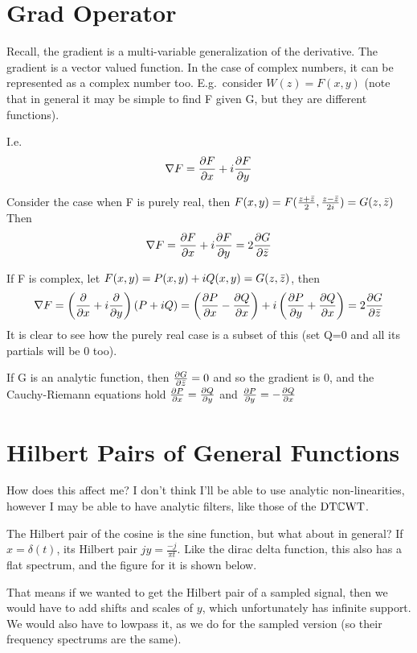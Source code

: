 \section{Grad Operator}
Recall, the gradient is a multi-variable  generalization of the derivative. The
gradient is a vector valued function. In the case of complex numbers, it can be
represented as a complex number too. E.g.\ consider $W(z) = F(x,y)$ (note that
in general it may be simple to find F given G, but they are different
functions).

I.e. 
$$\nabla F = \frac{\partial F}{\partial x} + i \frac{\partial F}{\partial y}$$

Consider the case when F is purely real, then 
$F(x,y) = F(\frac{z+\bar{z}}{2},\frac{z-\bar{z}}{2i}) = G(z,\bar{z})$
Then
$$\nabla F = \frac{\partial F}{\partial x} + i \frac{\partial F}{\partial y} = 2\frac{\partial G}{\partial \bar{z}}$$

If F is complex, let $F(x,y) = P(x,y) + iQ(x,y) = G(z,\bar{z})$, then
$$\nabla F = \left(\frac{\partial }{\partial x} + i \frac{\partial }{\partial y}\right)(P+iQ) 
           = \left(\frac{\partial P}{\partial x} - \frac{\partial Q}{\partial x}\right) + 
                i\left(\frac{\partial P}{\partial y} + \frac{\partial Q}{\partial x}\right) 
           = 2\frac{\partial G}{\partial \bar{z}}$$
It is clear to see how the purely real case is a subset of this (set Q=0 and
all its partials will be 0 too).

If G is an analytic function, then $\frac{\partial G}{\partial \bar{z}} = 0$ and so the gradient
is 0, and the Cauchy-Riemann equations hold $\frac{\partial P}{\partial x}=\frac{\partial Q}{\partial y}$ and 
$\frac{\partial P}{\partial y}=-\frac{\partial Q}{\partial x}$

\section{Hilbert Pairs of General Functions}
How does this affect me? I don't think I'll be able to use analytic
non-linearities, however I may be able to have analytic filters, like those of
the $\mathrm{DT}\mathbb{C}\mathrm{WT}$.

The Hilbert pair of the cosine is the sine function, but what about in general?
If $x=\delta(t)$, its Hilbert pair $jy = \frac{-j}{\pi t}$. Like the dirac
delta function, this also has a flat spectrum, and the figure for it is shown
below.

  \begin{center}
    
  \end{center}

That means if we wanted to get the Hilbert pair of a sampled signal, then we
would have to add shifts and scales of $y$, which unfortunately has infinite
support. We would also have to lowpass it, as we do for the sampled version
(so their frequency spectrums are the same).

